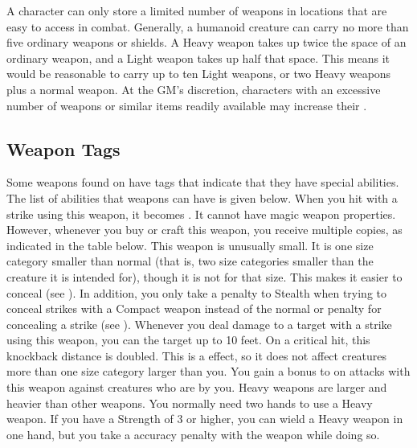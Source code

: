         A character can only store a limited number of weapons in locations that are easy to access in combat.
        Generally, a humanoid creature can carry no more than five ordinary weapons or shields.
        A Heavy weapon takes up twice the space of an ordinary weapon, and a Light weapon takes up half that space.
        This means it would be reasonable to carry up to ten Light weapons, or two Heavy weapons plus a normal weapon.
        At the GM's discretion, characters with an excessive number of weapons or similar items readily available may increase their .

    \subsection{Weapon Tags}\label{Weapon Tags}
        Some weapons found on  have tags that indicate that they have special abilities. The list of abilities that weapons can have is given below.
         When you hit with a strike using this weapon, it becomes .
        It cannot have magic weapon properties.
        However, whenever you buy or craft this weapon, you receive multiple copies, as indicated in the table below.
         This weapon is unusually small.
        It is one size category smaller than normal (that is, two size categories smaller than the creature it is intended for), though it is not  for that size.
        This makes it easier to conceal (see ).
        In addition, you only take a  penalty to Stealth when trying to conceal strikes with a Compact weapon instead of the normal  or  penalty for concealing a strike (see ).
         Whenever you deal damage to a target with a strike using this weapon, you can  the target up to 10 feet.
        On a critical hit, this knockback distance is doubled.
        This is a  effect, so it does not affect creatures more than one size category larger than you.
         You gain a  bonus to  on  attacks with this weapon against creatures who are \grappled by you.
         Heavy weapons are larger and heavier than other weapons.
        You normally need two hands to use a Heavy weapon.
        If you have a Strength of 3 or higher, you can wield a Heavy weapon in one hand, but you take a  accuracy penalty with the weapon while doing so.
